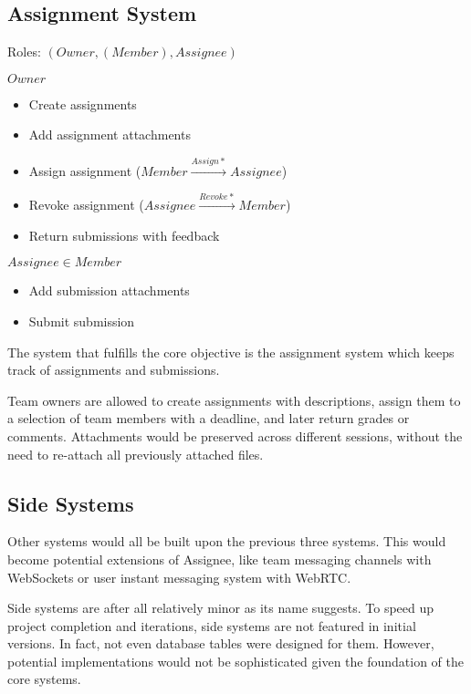 \subsection{Assignment System}
\label{overview.capab.assign}

Roles: $(Owner, (Member), Assignee)$

$Owner$
\begin{itemize}
	\item Create assignments

	\item Add assignment attachments

	\item Assign assignment ($Member\xrightarrow{Assign*}Assignee$)

	\item Revoke assignment ($Assignee\xrightarrow{Revoke*}Member$)

	\item Return submissions with feedback
\end{itemize}

$Assignee\in{}Member$
\begin{itemize}
	\item Add submission attachments

	\item Submit submission
\end{itemize}

The system that fulfills the core objective is the assignment system which keeps
track of assignments and submissions.

Team owners are allowed to create assignments with descriptions, assign them to a
selection of team members with a deadline, and later return grades or comments. Attachments
would be preserved across different sessions, without the need to re-attach all
previously attached files.

\subsection{Side Systems \textdagger{}}
\label{overview.capab.side}

Other systems would all be built upon the previous three systems. This would
become potential extensions of Assignee, like team messaging channels with WebSockets
or user instant messaging system with WebRTC.

\textdagger{} Side systems are after all relatively minor as its name suggests. To
speed up project completion and iterations, side systems are not featured in
initial versions. In fact, not even database tables were designed for them. However,
potential implementations would not be sophisticated given the foundation of the
core systems.

